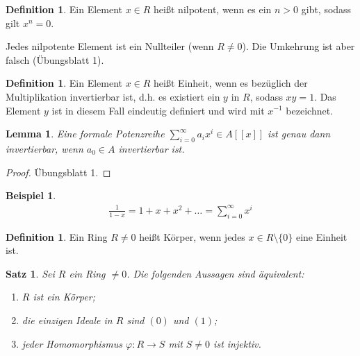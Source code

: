 \documentclass[reqno,12pt]{article}
\numberwithin{equation}{section}
\theoremstyle{plain}
\newtheorem{lemma}[thm]{Lemma}
\newtheorem{proposition}[thm]{Satz}
\theoremstyle{definition}
\newtheorem{definition}[thm]{Definition}
\newtheorem{example}[thm]{Beispiel}
\begin{document}
\begin{definition}
Ein Element $x \in R$ heißt {\sf nilpotent}, wenn es ein $n>0$ gibt, sodass gilt $x^n=0$.
\end{definition}

Jedes nilpotente Element ist ein Nullteiler (wenn $R \neq 0$). Die Umkehrung ist aber falsch (Übungsblatt 1).


\begin{definition}
Ein Element $x \in R$ heißt {\sf Einheit}, wenn es bezüglich der Multiplikation invertierbar ist, d.h. es existiert ein $y$  in $R$, sodass  $xy=1$. Das Element $y$ ist in diesem Fall eindeutig definiert und wird mit $x^{-1}$ bezeichnet.
\end{definition}

\begin{lemma}
  Eine formale Potenzreihe $\sum_{i=0}^{\infty} a_i x^i \in A[[x]]$ ist genau dann invertierbar, wenn $a_0 \in A$ invertierbar ist.
\end{lemma}
\begin{proof}
Übungsblatt 1.
\end{proof}

\begin{example}
\begin{align*}
  \frac{1}{1-x} = 1 + x + x^2 + \dots = \sum_{i=0}^{\infty} x^i
\end{align*}
\end{example}




\begin{definition}
Ein Ring $R \neq 0$ heißt {\sf Körper}, wenn jedes $x \in R \setminus \{0\}$ eine Einheit ist.
\end{definition}


\begin{proposition}
Sei $R$ ein Ring $\neq 0$. Die folgenden Aussagen sind äquivalent:
\begin{enumerate}
  \item $R$ ist ein Körper;
  \item die einzigen Ideale in $R$ sind $(0)$ und $(1)$;
  \item jeder Homomorphismus $\varphi \colon R \to S$ mit $S \neq 0$ ist injektiv.
\end{enumerate}
\end{proposition}
\end{document}
